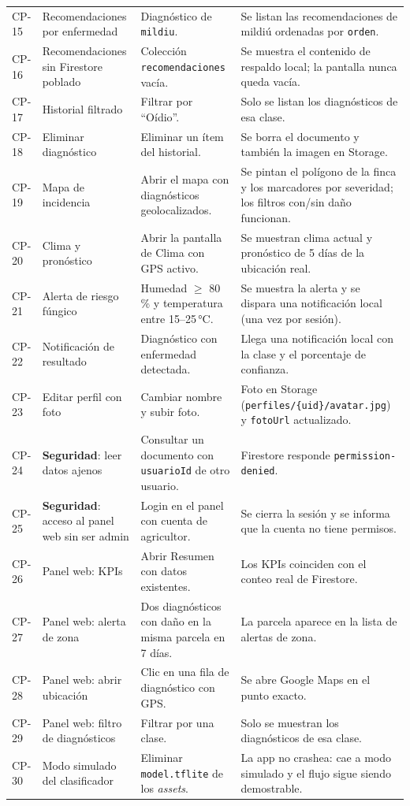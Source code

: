 \documentclass[12pt,a4paper]{article}
\begin{document}
\begin{longtable}{p{1.2cm} p{3.6cm} p{4.4cm} p{3.9cm}}
CP-15 & Recomendaciones por enfermedad & Diagnóstico de \texttt{mildiu}. & Se listan las recomendaciones de mildiú ordenadas por \texttt{orden}. \\
CP-16 & Recomendaciones sin Firestore poblado & Colección \texttt{recomendaciones} vacía. & Se muestra el contenido de respaldo local; la pantalla nunca queda vacía. \\
CP-17 & Historial filtrado & Filtrar por ``Oídio''. & Solo se listan los diagnósticos de esa clase. \\
CP-18 & Eliminar diagnóstico & Eliminar un ítem del historial. & Se borra el documento y también la imagen en Storage. \\
CP-19 & Mapa de incidencia & Abrir el mapa con diagnósticos geolocalizados. & Se pintan el polígono de la finca y los marcadores por severidad; los filtros con/sin daño funcionan. \\
CP-20 & Clima y pronóstico & Abrir la pantalla de Clima con GPS activo. & Se muestran clima actual y pronóstico de 5 días de la ubicación real. \\
CP-21 & Alerta de riesgo fúngico & Humedad $\geq$ 80\,\% y temperatura entre 15--25\,°C. & Se muestra la alerta y se dispara una notificación local (una vez por sesión). \\
CP-22 & Notificación de resultado & Diagnóstico con enfermedad detectada. & Llega una notificación local con la clase y el porcentaje de confianza. \\
CP-23 & Editar perfil con foto & Cambiar nombre y subir foto. & Foto en Storage (\texttt{perfiles/\{uid\}/avatar.jpg}) y \texttt{fotoUrl} actualizado. \\
CP-24 & \textbf{Seguridad}: leer datos ajenos & Consultar un documento con \texttt{usuarioId} de otro usuario. & Firestore responde \texttt{permission-denied}. \\
CP-25 & \textbf{Seguridad}: acceso al panel web sin ser admin & Login en el panel con cuenta de agricultor. & Se cierra la sesión y se informa que la cuenta no tiene permisos. \\
CP-26 & Panel web: KPIs & Abrir Resumen con datos existentes. & Los KPIs coinciden con el conteo real de Firestore. \\
CP-27 & Panel web: alerta de zona & Dos diagnósticos con daño en la misma parcela en 7 días. & La parcela aparece en la lista de alertas de zona. \\
CP-28 & Panel web: abrir ubicación & Clic en una fila de diagnóstico con GPS. & Se abre Google Maps en el punto exacto. \\
CP-29 & Panel web: filtro de diagnósticos & Filtrar por una clase. & Solo se muestran los diagnósticos de esa clase. \\
CP-30 & Modo simulado del clasificador & Eliminar \texttt{model.tflite} de los \textit{assets}. & La app no crashea: cae a modo simulado y el flujo sigue siendo demostrable. \\
\end{longtable}
\end{document}
